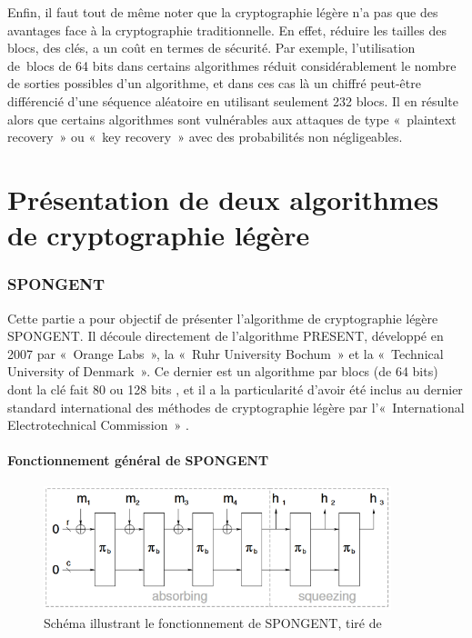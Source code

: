 Enfin, il faut tout de même noter que la cryptographie légère n'a pas que des
avantages face à la cryptographie traditionnelle. En effet, réduire les
tailles des blocs, des clés, a un coût en termes de sécurité. Par exemple,
l'utilisation de blocs de 64 bits dans certains algorithmes réduit
considérablement le nombre de sorties possibles d'un algorithme, et dans ces
cas là un chiffré peut-être différencié d'une séquence aléatoire en utilisant
seulement 232 blocs. Il en résulte alors que certains algorithmes sont
vulnérables aux attaques de type « plaintext recovery » ou « key recovery »
avec des probabilités non négligeables.

\newpage
\part{Présentation de deux algorithmes de cryptographie légère}

\section{SPONGENT}

Cette partie a pour objectif de présenter l'algorithme de cryptographie légère
SPONGENT. Il découle directement de l'algorithme PRESENT, développé en 2007
par « Orange Labs », la « Ruhr University Bochum » et la « Technical
University of Denmark ». Ce dernier est un algorithme par blocs (de 64 bits)
dont la clé fait 80 ou 128 bits \cite{PRESENT}, et il a la particularité
d'avoir été inclus au dernier standard international des méthodes de
cryptographie légère par l'« International Electrotechnical Commission »
\cite{ultraLightURL}.

\subsection{Fonctionnement général de SPONGENT}

\begin{figure}[!h]
	\centering
	\includegraphics[width=0.9\textwidth]{imgs/Spongent/fctGlobalSpongent.png}
	\caption{Schéma illustrant le fonctionnement de SPONGENT, tiré de \cite{6275435}}
	\label{fctGlobalSpongent}
\end{figure}

